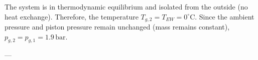 The system is in thermodynamic equilibrium and isolated from the outside (no heat exchange). Therefore, the temperature \( T_{g,2} = T_{EW} = 0^\circ \text{C} \). Since the ambient pressure and piston pressure remain unchanged (mass remains constant), \( p_{g,2} = p_{g,1} = 1.9 \, \text{bar} \).  

---